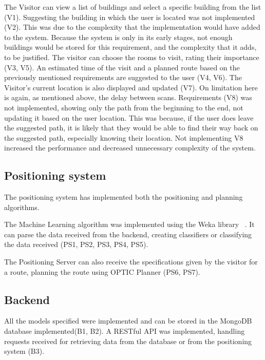 The Visitor can view a list of buildings and select a specific building from the list (V1). Suggesting the building in which the user is located was not implemented (V2). This was due to the complexity that the implementation would have added to the system. Because the system is only in its early stages, not enough buildings would be stored for this requirement, and the complexity that it adds, to be justified. The visitor can choose the rooms to visit, rating their importance (V3, V5). An estimated time of the visit and a planned route based on the previously mentioned requirements are suggested to the user (V4, V6). The Visitor's current location is also displayed and updated (V7). On limitation here is again, as mentioned above, the delay between scans. Requirements (V8) was not implemented, showing only the path from the beginning to the end, not updating it based on the user location. This was because, if the user does leave the suggested path, it is likely that they would be able to find their way back on the suggested path, especially knowing their location. Not implementing V8 increased the performance and decreased unnecessary complexity of the system.

\subsection{Positioning system}
The positioning system has implemented both the positioning and planning algorithms. 

The Machine Learning algorithm was implemented using the Weka library ~\cite{Weka}. It can parse the data received from the backend, creating classifiers or classifying the data received (PS1, PS2, PS3, PS4, PS5). 

The Positioning Server can also receive the specifications given by the visitor for a route, planning the route using OPTIC Planner (PS6, PS7).

\subsection{Backend}
All the models specified were implemented and can be stored in the MongoDB database implemented(B1, B2). A RESTful API was implemented, handling requests received for retrieving data from the database or from the positioning system (B3).     




 

